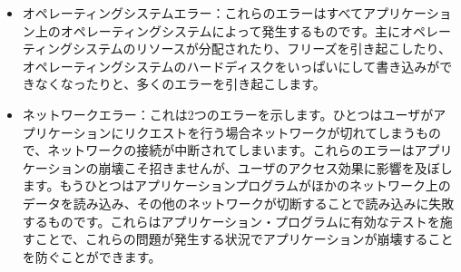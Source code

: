 \begin{itemize}
  \item オペレーティングシステムエラー：これらのエラーはすべてアプリケーション上のオペレーティングシステムによって発生するものです。主にオペレーティングシステムのリソースが分配されたり、フリーズを引き起こしたり、オペレーティングシステムのハードディスクをいっぱいにして書き込みができなくなったりと、多くのエラーを引き起こします。
  \item ネットワークエラー：これは2つのエラーを示します。ひとつはユーザがアプリケーションにリクエストを行う場合ネットワークが切れてしまうもので、ネットワークの接続が中断されてしまいます。これらのエラーはアプリケーションの崩壊こそ招きませんが、ユーザのアクセス効果に影響を及ぼします。もうひとつはアプリケーションプログラムがほかのネットワーク上のデータを読み込み、その他のネットワークが切断することで読み込みに失敗するものです。これらはアプリケーション・プログラムに有効なテストを施すことで、これらの問題が発生する状況でアプリケーションが崩壊することを防ぐことができます。
\end{itemize}
